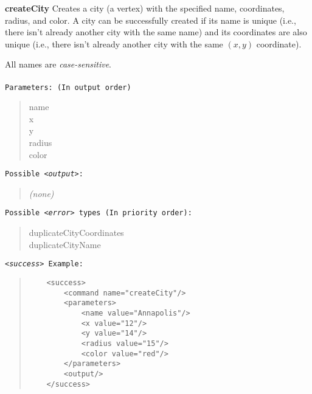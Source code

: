 \documentclass[12pt]{article}
\newenvironment{Description}
   {\begin{list}{}{\let\makelabel\Descriptionlabel
      \setlength\leftmargin{\labelwidth+\labelsep}
      \setlength\itemindent{-0.3em}}}%
   {\end{list}}
\newcommand*{\Descriptionlabel}[1]{%
  \parbox[b]{\labelwidth}
  {\makebox[0pt][l]{\textbf{#1}}\\}
  \hfill}
\begin{document}
\begin{Description}
\begin{Description}
	\item[\textbf{createCity}]
	Creates a city (a vertex) with the specified
	 name, coordinates, radius, and color. A city can be successfully created
  	if its name is unique (i.e., there isn't already another city with
 	 the same name) and its coordinates are also unique (i.e., there
  	isn't already another city with the same $(x,y)$ coordinate). 



All names are \emph{case-sensitive}.\\\\ 	
	\texttt{Parameters: (In output order)}
	\begin{quote}
		name\\
		x\\
		y\\
		radius\\
		color
	\end{quote}
	\texttt{Possible \emph{<output>}:}
	\begin{quote}
		\emph{(none)}
	\end{quote}
	\texttt{Possible \emph{<error>} types (In priority order):}
	\begin{quote}
		duplicateCityCoordinates \\     %
		duplicateCityName 
	\end{quote}
	\texttt{\emph{<success>} Example:}
	\begin{quote}
	\begin{verbatim}
	<success>
	    <command name="createCity"/>
	    <parameters>
	        <name value="Annapolis"/>
	        <x value="12"/>
	        <y value="14"/>
	        <radius value="15"/>
	        <color value="red"/>
	    </parameters>
	    <output/>
	</success>
	\end{verbatim}
	\end{quote}


\end{Description}
\end{Description}
\end{document}

